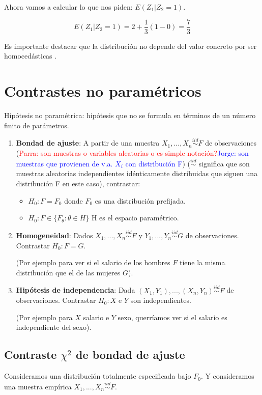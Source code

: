 \documentclass[nochap]{apuntes}
\begin{document}
\begin{example}
Ahora vamos a calcular lo que nos piden: $E(Z_1|Z_2=1)$.

\[E(Z_1|Z_2=1) = 2 + \frac{1}{3}(1-0) = \frac{7}{3}\]

Es importante destacar que la distribución no depende del valor concreto por ser homocedásticas .

\end{example}

\chapter{Contrastes no paramétricos}
Hipótesis no paramétrica: hipótesis que no se formula en términos de un número finito de parámetros.

\begin{enumerate}
\item \textbf{Bondad de ajuste}: A partir de una muestra $X_1,...,X_n \stackrel{iid}{\sim} F$ de observaciones ({\textcolor{red}{Parra: son muestras o variables aleatorias o es simple notación?}}{\textcolor{blue}{Jorge: son muestras que provienen de v.a. $X_i$ con distribución F}}) ($\stackrel{iid}{\sim}$ significa que son muestras aleatorias independientes idénticamente distribuidas que siguen una distribución F en este caso), contrastar:
\begin{itemize}
\item $H_0: F=F_0$ donde $F_0$ es una distribución prefijada.
\item $H_0: F \in \{F_{\theta} : \theta\in H\}$ H es el espacio paramétrico.
\end{itemize}
\item \textbf{ Homogeneidad}: Dados $X_1,...,X_n \stackrel{iid}{\sim} F$ y $Y_1,...,Y_n \stackrel{iid}{\sim} G$ de observaciones. Contrastar $H_0: F=G$.

(Por ejemplo para ver si el salario de los hombres $F$ tiene la misma distribución que el de las mujeres $G$).

\item \textbf{Hipótesis de independencia}: Dada $(X_1,Y_1),...,(X_n,Y_n) \stackrel{iid}{\sim} F$ de observaciones. Contrastar $H_0: X$ e $Y$ son independientes.

(Por ejemplo para $X$ salario e $Y$ sexo, querríamos ver si el salario es independiente del sexo).
\end{enumerate}

\section{Contraste $\chi^2$ de bondad de ajuste}
Consideramos una distribución totalmente especificada bajo $F_0$. Y consideramos una muestra empírica $X_1,...,X_n \stackrel{iid}{\sim} F$.
\end{document}
